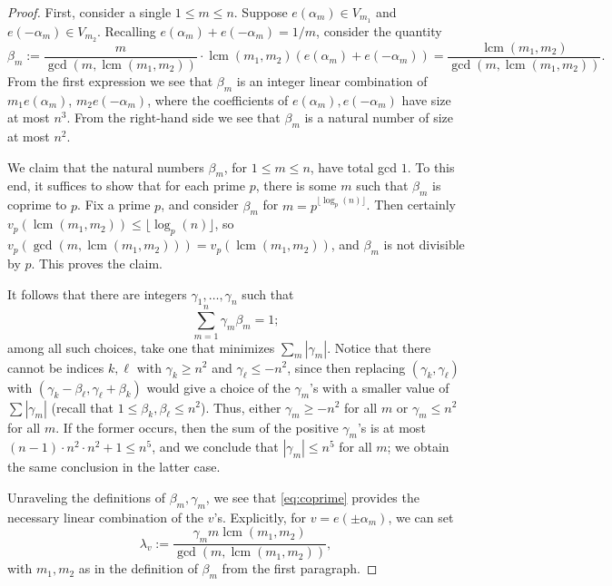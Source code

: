 \documentclass[11pt]{amsart}
\theoremstyle{definition}
\DeclareMathOperator{\lcm}{lcm}
\begin{document}
\begin{proof}
First, consider a single $1 \leq m \leq n$.  Suppose $e(\alpha_m) \in V_{m_1}$ and $e(-\alpha_m) \in V_{m_2}$.  Recalling $e(\alpha_m)+e(-\alpha_m)=1/m$, consider the quantity
\begin{equation*}\label{eq:lcm-multiple}
\beta_m:=\frac{m}{\gcd(m,\lcm(m_1,m_2))} \cdot \lcm(m_1,m_2)(e(\alpha_m)+e(-\alpha_m))=\frac{\lcm(m_1,m_2)}{\gcd(m,\lcm(m_1,m_2))}.
\end{equation*}
From the first expression we see that $\beta_m$ is an integer linear combination of $m_1e(\alpha_m)$, $m_2e(-\alpha_m)$, where the coefficients of $e(\alpha_m), e(-\alpha_m)$ have size at most $n^3$.  From the right-hand side we see that $\beta_m$ is a natural number of size at most $n^2$.

We claim that the natural numbers $\beta_m$, for $1 \leq m \leq n$, have total gcd $1$.  To this end, it suffices to show that for each prime $p$, there is some $m$ such that $\beta_m$ is coprime to $p$.  Fix a prime $p$, and consider $\beta_m$ for $m=p^{\lfloor \log_p(n) \rfloor}$.  Then certainly $v_p(\lcm(m_1,m_2)) \leq \lfloor \log_p(n) \rfloor$, so $v_p(\gcd(m,\lcm(m_1,m_2)))=v_p(\lcm(m_1,m_2))$, and $\beta_m$ is not divisible by $p$.  This proves the claim.

It follows that there are integers $\gamma_1, \ldots, \gamma_n$ such that
\begin{equation}\label{eq:coprime}
\sum_{m=1}^n \gamma_m \beta_m=1;
\end{equation}
among all such choices, take one that minimizes $\sum_m |\gamma_m|$.  Notice that there cannot be indices $k,\ell$ with $\gamma_k\geq n^2$ and $\gamma_\ell\leq -n^2$, since then replacing $(\gamma_k,\gamma_\ell)$ with $(\gamma_k-\beta_\ell, \gamma_\ell+\beta_k)$ would give a choice of the $\gamma_m$'s with a smaller value of $\sum |\gamma_m|$ (recall that $1 \leq \beta_k,\beta_\ell \leq n^2$).  Thus, either $\gamma_m \geq -n^2$ for all $m$ or $\gamma_m \leq n^2$ for all $m$.  If the former occurs, then the sum of the positive $\gamma_m$'s is at most $(n-1) \cdot n^2 \cdot n^2+1 \leq n^5$, and we conclude that $|\gamma_m| \leq n^5$ for all $m$; we obtain the same conclusion in the latter case.

Unraveling the definitions of $\beta_m,\gamma_m$, we see that \eqref{eq:coprime} provides the necessary linear combination of the $v$'s.  Explicitly, for $v=e(\pm \alpha_m)$, we can set
$$\lambda_v:=\frac{\gamma_m m \lcm(m_1,m_2)}{\gcd(m,\lcm(m_1,m_2))},$$
with $m_1,m_2$ as in the definition of $\beta_m$ from the first paragraph.
\end{proof}
\end{document}
